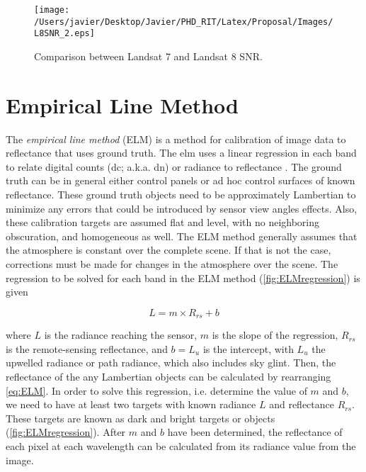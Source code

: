 \begin{figure}[htb]
\centering
      \texttt{[image: /Users/javier/Desktop/Javier/PHD\_RIT/Latex/Proposal/Images/L8SNR\_2.eps]}
      \caption{Comparison between Landsat 7 and Landsat 8 SNR. \label{fig:L8SNR} } 
      \label{fig:olisnr}
\end{figure}

\section{Empirical Line Method}
\label{sec:ELM}
The {\it empirical line method} (ELM) is a method for calibration of image data to reflectance that uses ground truth. The \acrshort{elm} uses a linear regression in each band to relate digital counts (\acrshort{dc}; a.k.a. \gls{dn}) or radiance to reflectance \citep{Schott,Smith:1999}. The ground truth can be in general  either control panels or ad hoc control surfaces of known reflectance. These ground truth objects need to be approximately Lambertian to minimize any errors that could be introduced by sensor view angles effects. Also, these calibration targets are assumed flat and level, with no neighboring obscuration, and homogeneous as well. The ELM method generally assumes that the atmosphere is constant over the complete scene. If that is not the case, corrections must be made for changes in the atmosphere over the scene. The regression to be solved for each band in the ELM method (\autoref{fig:ELMregression}) is given 

\begin{equation}
	\label{eq:ELM} 
	L = m\times R_{rs} + b
\end{equation}

where $L$ is the radiance reaching the sensor, $m$ is the slope of the regression, $R_{rs}$ is the remote-sensing reflectance, and $b=L_u$ is the intercept, with $L_u$ the upwelled radiance or path radiance, which also includes sky glint. Then, the reflectance of the any Lambertian objects can be calculated by rearranging \autoref{eq:ELM}. In order to solve this regression, i.e. determine the value of $m$ and $b$, we need to have at least two targets with known radiance $L$ and reflectance $R_{rs}$. These targets are known as dark and bright targets or objects (\autoref{fig:ELMregression}). After $m$ and $b$ have been determined, the reflectance of each pixel at each wavelength can be calculated from its radiance value from the image.

